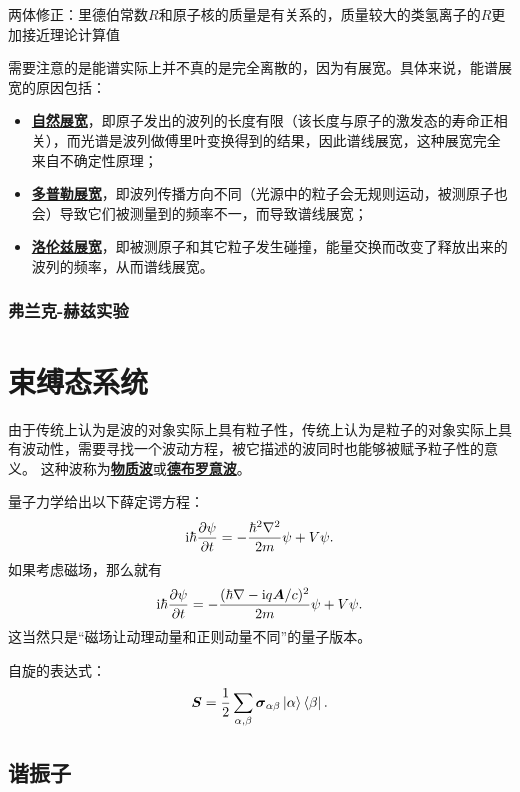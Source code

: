 \documentclass[UTF8, a4paper]{ctexart}
\newcommand*{\ii}{\mathrm{i}}
\newcommand{\concept}[1]{\underline{\textbf{#1}}}
\begin{document}
两体修正：里德伯常数$R$和原子核的质量是有关系的，质量较大的类氢离子的$R$更加接近理论计算值

需要注意的是能谱实际上并不真的是完全离散的，因为有展宽。具体来说，能谱展宽的原因包括：
\begin{itemize}
    \item \concept{自然展宽}，即原子发出的波列的长度有限（该长度与原子的激发态的寿命正相关），而光谱是波列做傅里叶变换得到的结果，因此谱线展宽，这种展宽完全来自不确定性原理；
    \item \concept{多普勒展宽}，即波列传播方向不同（光源中的粒子会无规则运动，被测原子也会）导致它们被测量到的频率不一，而导致谱线展宽；
    \item \concept{洛伦兹展宽}，即被测原子和其它粒子发生碰撞，能量交换而改变了释放出来的波列的频率，从而谱线展宽。
\end{itemize}

\subsubsection{弗兰克-赫兹实验}

\section{束缚态系统}

由于传统上认为是波的对象实际上具有粒子性，传统上认为是粒子的对象实际上具有波动性，需要寻找一个波动方程，被它描述的波同时也能够被赋予粒子性的意义。
这种波称为\concept{物质波}或\concept{德布罗意波}。

量子力学给出以下薛定谔方程：
\begin{equation}
    \ii \hbar \pdv{\psi}{t} = - \frac{\hbar^2 \laplacian}{2m} \psi + V \psi.
\end{equation}
如果考虑磁场，那么就有
\begin{equation}
    \ii \hbar \pdv{\psi}{t} = - \frac{(\hbar \nabla - \ii q \vb*{A}/c)^2}{2m} \psi + V \psi.
\end{equation}
这当然只是“磁场让动理动量和正则动量不同”的量子版本。

自旋的表达式：
\begin{equation}
    \vb*{S} = \frac{1}{2} \sum_{\alpha, \beta} \vb*{\sigma}_{\alpha \beta} \ket{\alpha} \bra{\beta}.
\end{equation}

\subsection{谐振子}
\end{document}
